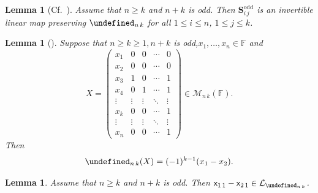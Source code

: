 \documentclass{elsarticle}
\let\det\undefined
\DeclareMathOperator{\det}{det}
\def\F{{\mathbb F}}
\def\M{{\mathcal M}}
\def\SCS{{\mathbf S}}
\newtheorem{lemma}[theorem]{Lemma}
\theoremstyle{definition}
\numberwithin{equation}{section}
\begin{document}
\begin{lemma}[{Cf.~\cite[Lemma~3.5]{Guterman2025b}}]\label{lem:ReduceTo11ByShiftOdd}Assume that $n \ge k$ and $n + k$ is odd. Then $\SCS^{\mathrm{odd}}_{i\,j}$ is an invertible linear map preserving $\det_{n\,k}$ for all $1 \le i \le n$, $1 \le j \le k$.
\end{lemma}
\begin{lemma}[{\cite[Lemma~3.2]{Guterman2025b}}]\label{lem:DetNKXiEqX1Odd}Suppose that $n \ge k \ge 1, n+k$ is odd,\linebreak $x_1, \ldots, x_n \in \F$ and
\[
X = \begin{pmatrix}
x_1 & 0 & 0 & \cdots & 0\\
x_2 & 0 & 0 & \cdots & 0\\
x_3 & 1 & 0 &\cdots & 1\\
x_4 & 0 & 1 &\cdots & 1\\
\vdots & \vdots & \vdots & \ddots & \vdots\\
x_k & 0 & 0 & \cdots & 1\\
\vdots & \vdots & \vdots & \ddots & \vdots\\
x_{n} & 0 & 0 & \cdots & 1
\end{pmatrix} \in \M_{n\,k}(\F).
\]
Then
\[
\det_{n\,k}(X) = (-1)^{k-1}(x_1 - x_2).
\]
\end{lemma}



\begin{lemma}\label{lem:NKOdd11InL}Assume that  $n \ge k$ and  $n + k$ is odd. Then $\mathsf x_{1\,1}  - \mathsf x_{2\,1} \in \mathcal L_{\det_{n\,k}}$.
\end{lemma}
\end{document}
